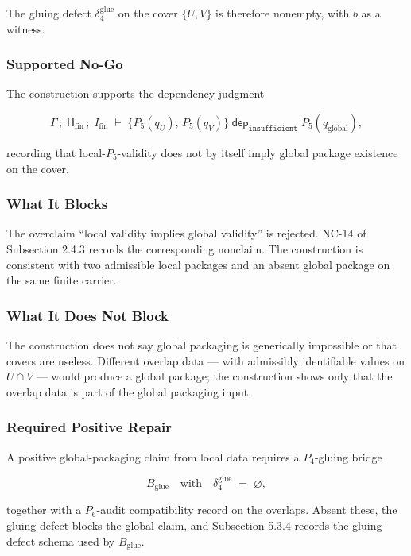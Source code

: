 \documentclass[11pt]{article}
\theoremstyle{definition}
\begin{document}
The gluing defect \(\delta_4^{\mathrm{glue}}\) on the cover \(\{U,V\}\) is therefore nonempty, with \(b\) as a witness.

\subsubsection{Supported No-Go}

The construction supports the dependency judgment

\[
\Gamma\,;\;\mathsf H_{\mathrm{fin}}\,;\;I_{\mathrm{fin}}\;\vdash\;\bigl\{P_5(q_U),\,P_5(q_V)\bigr\}\;\mathrel{\mathsf{dep}_{\texttt{insufficient}}}\;P_5(q_{\mathrm{global}}),
\]

recording that local-\(P_5\)-validity does not by itself imply global package existence on the cover.

\subsubsection{What It Blocks}

The overclaim ``local validity implies global validity'' is rejected. NC-14 of Subsection 2.4.3 records the corresponding nonclaim. The construction is consistent with two admissible local packages and an absent global package on the same finite carrier.

\subsubsection{What It Does Not Block}

The construction does not say global packaging is generically impossible or that covers are useless. Different overlap data --- with admissibly identifiable values on \(U\cap V\) --- would produce a global package; the construction shows only that the overlap data is part of the global packaging input.

\subsubsection{Required Positive Repair}

A positive global-packaging claim from local data requires a \(P_4\)-gluing bridge

\[
B_{\mathrm{glue}}\quad\text{with}\quad \delta_4^{\mathrm{glue}}\;=\;\varnothing,
\]

together with a \(P_6\)-audit compatibility record on the overlaps. Absent these, the gluing defect blocks the global claim, and Subsection 5.3.4 records the gluing-defect schema used by \(B_{\mathrm{glue}}\).
\end{document}
